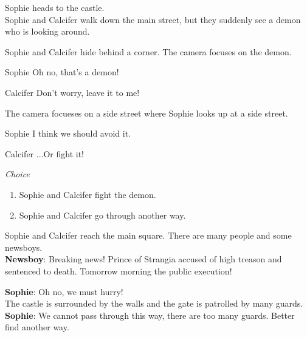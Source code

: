 \noindent Sophie heads to the castle.\\
\noindent Sophie and Calcifer walk down the main street, but they suddenly see a demon who is looking around.

\begin{screenplay}

Sophie and Calcifer hide behind a corner. The camera focuses on the demon.

\begin{dialogue}[worried]{Sophie}
Oh no, that’s a demon!
\end{dialogue}
\begin{dialogue}[feisty]{Calcifer}
Don’t worry, leave it to me!
\end{dialogue}

The camera focueses on a side street where Sophie looks up at a side street.

\begin{dialogue}{Sophie}
I think we should avoid it.
\end{dialogue}

\begin{dialogue}{Calcifer}
...Or fight it!
\end{dialogue}
\end{screenplay}

\textit{Choice}
\begin{enumerate}
  \item Sophie and Calcifer fight the demon.
  \item Sophie and Calcifer go through another way.
\end{enumerate}
  
\noindent Sophie and Calcifer reach the main square. There are many people and some newsboys. \\

\textbf{Newsboy}: Breaking news! Prince of Strangia accused of high treason and sentenced to death. Tomorrow morning the public execution!

\textbf{Sophie}: Oh no, we must hurry!\\

The castle is surrounded by the walls and the gate is patrolled by many guards.\\

\textbf{Sophie}: We cannot pass through this way, there are too many guards. Better find another way.\\

